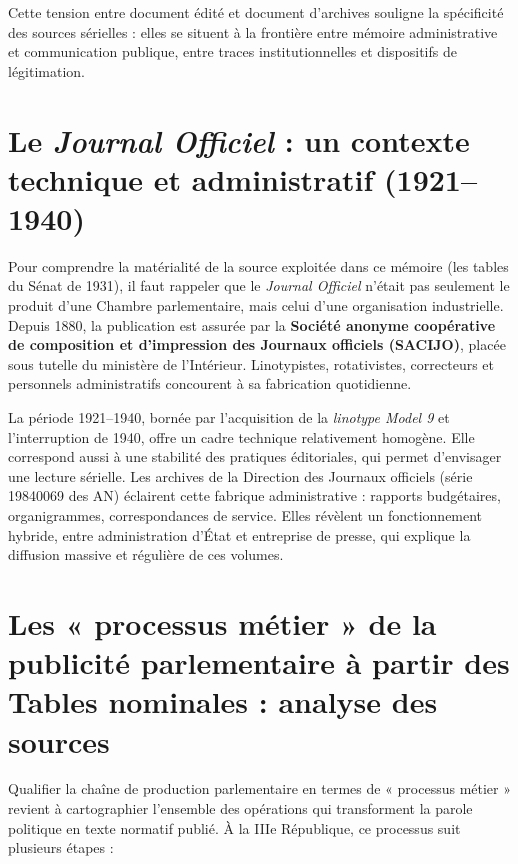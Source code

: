 Cette tension entre document édité et document d’archives souligne la spécificité des sources sérielles : elles se situent à la frontière entre mémoire administrative et communication publique, entre traces institutionnelles et dispositifs de légitimation.

\section{Le \emph{Journal Officiel} : un contexte technique et administratif (1921–1940)}

Pour comprendre la matérialité de la source exploitée dans ce mémoire (les tables du Sénat de 1931), il faut rappeler que le \emph{Journal Officiel} n’était pas seulement le produit d’une Chambre parlementaire, mais celui d’une organisation industrielle. Depuis 1880, la publication est assurée par la \textbf{Société anonyme coopérative de composition et d’impression des Journaux officiels (SACIJO)}, placée sous tutelle du ministère de l’Intérieur. Linotypistes, rotativistes, correcteurs et personnels administratifs concourent à sa fabrication quotidienne.

La période 1921–1940, bornée par l’acquisition de la \emph{linotype Model 9} et l’interruption de 1940, offre un cadre technique relativement homogène. Elle correspond aussi à une stabilité des pratiques éditoriales, qui permet d’envisager une lecture sérielle. Les archives de la Direction des Journaux officiels (série 19840069 des AN) éclairent cette fabrique administrative : rapports budgétaires, organigrammes, correspondances de service. Elles révèlent un fonctionnement hybride, entre administration d’État et entreprise de presse, qui explique la diffusion massive et régulière de ces volumes.

\section{Les « processus métier » de la publicité parlementaire à partir des Tables nominales : analyse des sources}

Qualifier la chaîne de production parlementaire en termes de « processus métier » revient à cartographier l’ensemble des opérations qui transforment la parole politique en texte normatif publié. À la IIIe République, ce processus suit plusieurs étapes :

